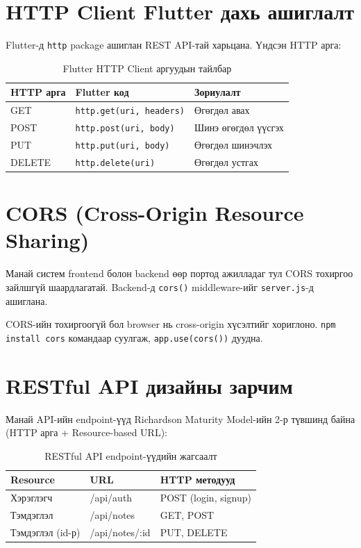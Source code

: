 \section{HTTP Client Flutter дахь ашиглалт}

Flutter-д \texttt{http} package ашиглан REST API-тай харьцана.
Үндсэн HTTP арга:

\begin{longtable}{|p{3cm}|p{4cm}|p{6cm}|}
\caption{Flutter HTTP Client аргуудын тайлбар}\\
\hline
\textbf{HTTP арга} & \textbf{Flutter код} & \textbf{Зориулалт} \\
\hline
GET & \texttt{http.get(uri, headers)} & Өгөгдөл авах \\
\hline
POST & \texttt{http.post(uri, body)} & Шинэ өгөгдөл үүсгэх \\
\hline
PUT & \texttt{http.put(uri, body)} & Өгөгдөл шинэчлэх \\
\hline
DELETE & \texttt{http.delete(uri)} & Өгөгдөл устгах \\
\hline
\end{longtable}

\section{CORS (Cross-Origin Resource Sharing)}

Манай систем frontend болон backend өөр портод ажилладаг тул CORS тохиргоо зайлшгүй
шаардлагатай. Backend-д \texttt{cors()} middleware-ийг \texttt{server.js}-д ашиглана.

CORS-ийн тохиргоогүй бол browser нь cross-origin хүсэлтийг хориглоно.
\texttt{npm install cors} командаар суулгаж, \texttt{app.use(cors())} дуудна.

\section{RESTful API дизайны зарчим}

Манай API-ийн endpoint-үүд Richardson Maturity Model-ийн 2-р түвшинд байна
(HTTP арга + Resource-based URL):

\begin{longtable}{|p{4cm}|p{3cm}|p{6cm}|}
\caption{RESTful API endpoint-үүдийн жагсаалт}\\
\hline
\textbf{Resource} & \textbf{URL} & \textbf{HTTP методууд} \\
\hline
Хэрэглэгч & /api/auth & POST (login, signup) \\
\hline
Тэмдэглэл & /api/notes & GET, POST \\
\hline
Тэмдэглэл (id-р) & /api/notes/:id & PUT, DELETE \\
\hline
\end{longtable}
